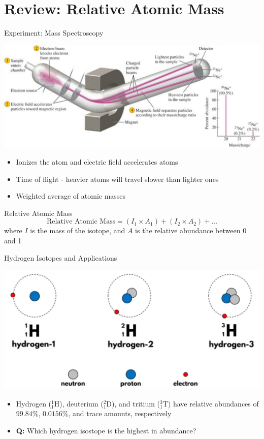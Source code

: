 \documentclass[11pt]{beamer}
\begin{document}
\section{Review: Relative Atomic Mass}

\begin{frame}{Experiment: Mass Spectroscopy}
  \begin{center}
    \includegraphics[width=\linewidth]{mass_spect}
  \end{center}

  \begin{itemize}
  \item Ionizes the atom and electric field accelerates atoms
  \item Time of flight - heavier atoms will travel slower
    than lighter ones
  \item Weighted average of atomic masses
  \end{itemize}  
\end{frame}

\begin{frame}{Relative Atomic Mass}
  \begin{equation}
    \text{Relative Atomic Mass} = (I_1\times A_1) + (I_2\times A_2) + \dots
  \end{equation}
  where $I$ is the mass of the isotope, and $A$ is the
  relative abundance between 0 and 1
\end{frame}

\begin{frame}{Hydrogen Isotopes and Applications}
  \begin{center}
    \includegraphics[width=0.75\linewidth]{hydro_iso}
  \end{center}

  \begin{itemize}
  \item Hydrogen ($^1_1$H), deuterium ($^2_1$D), and tritium ($^3_1$T)
    have relative abundances of $99.84\%$, $0.0156\%$, and trace amounts,
    respectively
  \item \textbf{Q:} Which hydrogen isostope is the highest in abundance?
  \end{itemize}
\end{frame}
\end{document}
